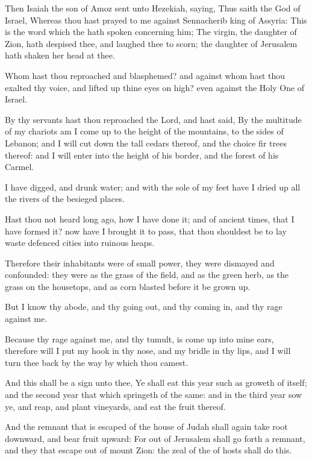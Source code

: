 \verse Then Isaiah the son of Amoz sent unto Hezekiah, saying, Thus saith the \LORD God of Israel, Whereas thou hast prayed to me against Sennacherib king of Assyria: \verse This is the word which the \LORD hath spoken concerning him; The virgin, the daughter of Zion, hath despised thee, and laughed thee to scorn; the daughter of Jerusalem hath shaken her head at thee.

\verse Whom hast thou reproached and blasphemed? and against whom hast thou exalted thy voice, and lifted up thine eyes on high? even against the Holy One of Israel.

\verse By thy servants hast thou reproached the Lord, and hast said, By the multitude of my chariots am I come up to the height of the mountains, to the sides of Lebanon; and I will cut down the tall cedars thereof, and the choice fir trees thereof: and I will enter into the height of his border, and the forest of his Carmel.

\verse I have digged, and drunk water; and with the sole of my feet have I dried up all the rivers of the besieged places.

\verse Hast thou not heard long ago, how I have done it; and of ancient times, that I have formed it? now have I brought it to pass, that thou shouldest be to lay waste defenced cities into ruinous heaps.

\verse Therefore their inhabitants were of small power, they were dismayed and confounded: they were as the grass of the field, and as the green herb, as the grass on the housetops, and as corn blasted before it be grown up.

\verse But I know thy abode, and thy going out, and thy coming in, and thy rage against me.

\verse Because thy rage against me, and thy tumult, is come up into mine ears, therefore will I put my hook in thy nose, and my bridle in thy lips, and I will turn thee back by the way by which thou camest.

\verse And this shall be a sign unto thee, Ye shall eat this year such as groweth of itself; and the second year that which springeth of the same: and in the third year sow ye, and reap, and plant vineyards, and eat the fruit thereof.

\verse And the remnant that is escaped of the house of Judah shall again take root downward, and bear fruit upward: \verse For out of Jerusalem shall go forth a remnant, and they that escape out of mount Zion: the zeal of the \LORD of hosts shall do this.

